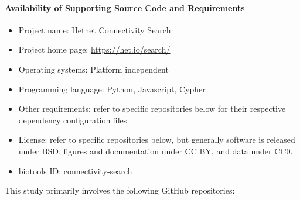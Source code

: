 \hypertarget{availability-of-supporting-source-code-and-requirements}{%
\paragraph{Availability of Supporting Source Code and Requirements}\label{availability-of-supporting-source-code-and-requirements}}

\begin{itemize}
\tightlist
\item
  Project name: Hetnet Connectivity Search
\item
  Project home page: \url{https://het.io/search/}
\item
  Operating systems: Platform independent
\item
  Programming language: Python, Javascript, Cypher
\item
  Other requirements:
  refer to specific repositories below for their respective dependency configuration files
\item
  License:
  refer to specific repositories below,
  but generally software is released under BSD,
  figures and documentation under CC BY,
  and data under CC0.
\item
  biotools ID: \href{https://bio.tools/connectivity-search}{connectivity-search}
\end{itemize}

This study primarily involves the following GitHub repositories:

